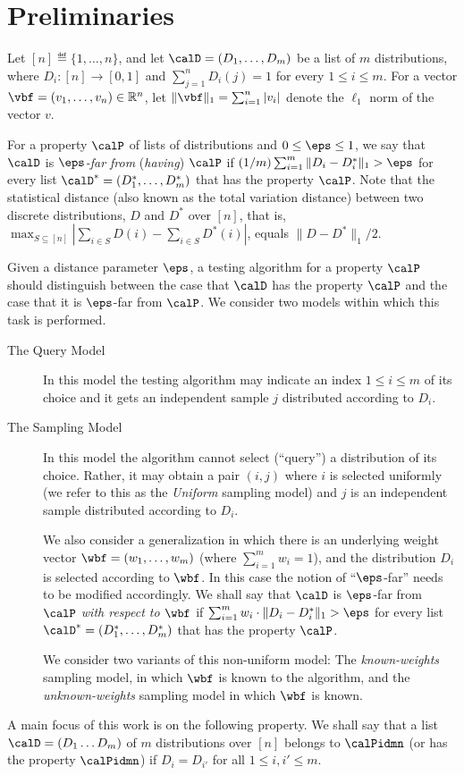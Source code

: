 \section{Preliminaries}\label{prel.sec}

Let $[n]\eqdef \{1,\ldots,n\}$, and let
$\calD = (D_1,\ldots,D_m)$ be a list of $m$ distributions,
where $D_i : [n] \to [0,1]$ and $\sum_{j=1}^n D_i(j) =1$
for every $1 \leq i \leq m$.
For a vector $\vbf = (v_1,\ldots,v_n) \in \mathbb{R}^n$,
let $\|\vbf\|_1 = \sum_{i=1}^n |v_i|$ denote the
$\ell_1$ norm of the vector $v$.

%
For a property  $\calP$ of lists of distributions and
$0 \leq \eps \leq 1$, we say that
$\calD$ is {\em $\eps$-far from\/} (\emph{having}) $\calP$ if
$({1}/{m}) \sum_{i=1}^m \|D_i - D^*_i\|_1 > \eps$
for every list $\calD^* = (D^*_1,\ldots,D^*_m)$
that has the property $\calP$. Note that
the statistical distance (also known as the total variation distance)
between two discrete distributions, $D$ and $D^*$ over $[n]$,
that is,
$\max_{S\subseteq [n]} \left| \sum_{i\in S} D(i) -\sum_{i\in S} D^*(i)\right|$,
 equals $\|D - D^*\|_1/2$.

Given a distance parameter $\eps$,
a testing algorithm for a property $\calP$
%
should distinguish between the case that $\calD$ has the property
$\calP$ and the case that it is $\eps$-far from $\calP$. We consider
two models within which this task is performed.
\begin{description}
\item[The Query Model]
In this model the testing algorithm may indicate an index $1 \leq i \leq m$ of
its choice and it gets an independent sample $j$ distributed according to $D_i$.
\item[The Sampling Model]
In this model the algorithm cannot select (``query'') a distribution of
its choice. Rather, it may obtain a pair $(i,j)$ where $i$ is selected
uniformly (we refer to this as the \emph{Uniform} sampling model)
and $j$ is an independent sample distributed according to $D_i$.

We also consider a generalization in which there is an underlying
weight vector $\wbf = (w_1,\ldots,w_m)$ (where $\sum_{i=1}^m w_i = 1$),
and the distribution $D_i$ is selected according to $\wbf$.
In this case the notion of ``$\eps$-far'' %
needs to be modified accordingly.
%
We shall say  %
that $\calD$ is $\eps$-far from $\calP$ \emph{with respect to $\wbf$}
if $\sum_{i=1}^m w_i\cdot \|D_i - D^*_i\|_1 > \eps $
for every list $\calD^* = (D^*_1,\ldots,D^*_m)$
that has the property $\calP$.

We consider two variants of this non-uniform model:
The \emph{known-weights} sampling model, in which $\wbf$ is known
to the algorithm, and the \emph{unknown-weights} sampling model
in which $\wbf$ is known.
%
%
%
%
%
\end{description}

%
%
%
%
%
%

A main focus of this work is on the following property.
We shall say that a list $\calD = (D_1 \ldots D_m)$ of $m$ distributions over $[n]$
belongs to $\calPidmn$ (or has the property $\calPidmn$) if $D_i = D_{i'}$ for all
$1 \leq i, i' \leq m$.
